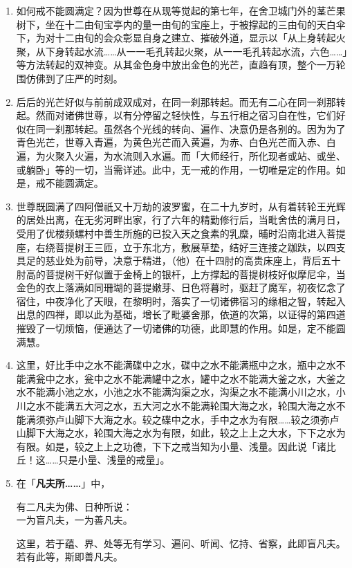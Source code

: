\begin{enumerate}
\item 如何戒不能圆满定？因为世尊在从现等觉起的第七年，在舍卫城门外的茎芒果树下，坐在十二由旬宝亭内的量一由旬的宝座上，于被撑起的三由旬的天白伞下，为对十二由旬的会众彰显自身之建立、摧破外道，显示以「从上身转起火聚，从下身转起水流……从一一毛孔转起火聚，从一一毛孔转起水流，六色……」等方法转起的双神变。从其金色身中放出金色的光芒，直趋有顶，整个一万轮围仿佛到了庄严的时刻。
\item 后后的光芒好似与前前成双成对，在同一刹那转起。而无有二心在同一刹那转起。然而对诸佛世尊，以有分停留之轻快性，与五行相之宿习自在性，它们好似在同一刹那转起。虽然各个光线的转向、遍作、决意仍是各别的。因为为了青色光芒，世尊入青遍，为黄色光芒而入黄遍，为赤、白色光芒而入赤、白遍，为火聚入火遍，为水流则入水遍。而「大师经行，所化现者或站、或坐、或躺卧」等的一切，当需详述。此中，无一戒的作用，一切唯是定的作用。如是，戒不能圆满定。
\item 世尊既圆满了四阿僧祇又十万劫的波罗蜜，在二十九岁时，从有着转轮王光辉的居处出离，在无劣河畔出家，行了六年的精勤修行后，当毗舍佉的满月日，受用了优楼频螺村中善生所施的已投入天之食素的乳糜，晡时沿南北进入菩提座，右绕菩提树王三匝，立于东北方，敷展草垫，结好三连接之跏趺，以四支具足的慈业处为前导，决意于精进，（他）在十四肘的高贵床座上，背后五十肘高的菩提树干好似置于金椅上的银杆，上方撑起的菩提树枝好似摩尼伞，当金色的衣上落满如同珊瑚的菩提嫩芽、日色将暮时，驱赶了魔军，初夜忆念了宿住，中夜净化了天眼，在黎明时，落实了一切诸佛宿习的缘相之智，转起入出息的四禅，即以此为基础，增长了毗婆舍那，依道的次第，以证得的第四道摧毁了一切烦恼，便通达了一切诸佛的功德，此即慧的作用。如是，定不能圆满慧。
\item 这里，好比手中之水不能满碟中之水，碟中之水不能满瓶中之水，瓶中之水不能满瓮中之水，瓮中之水不能满罐中之水，罐中之水不能满大釜之水，大釜之水不能满小池之水，小池之水不能满沟渠之水，沟渠之水不能满小川之水，小川之水不能满五大河之水，五大河之水不能满轮围大海之水，轮围大海之水不能满须弥卢山脚下大海之水。较之碟中之水，手中之水为有限……较之须弥卢山脚下大海之水，轮围大海之水为有限，如此，较之上上之大水，下下之水为有限。如是，较之上上之功德，下下之戒当知为小量、浅量。因此说「诸比丘！这……只是小量、浅量的戒量」。
\item 在「\textbf{凡夫所……}」中，\begin{quoting}有二凡夫为佛、日种所说：\\一为盲凡夫，一为善凡夫。\end{quoting}这里，若于蕴、界、处等无有学习、遍问、听闻、忆持、省察，此即盲凡夫。若有此等，斯即善凡夫。

\end{enumerate}
